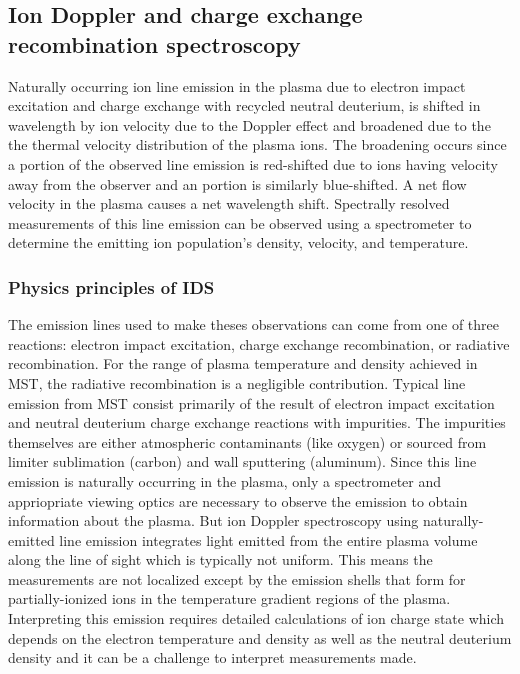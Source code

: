 \subsection{Ion Doppler and charge exchange recombination spectroscopy}\label{sec:ids}

Naturally occurring ion line emission in the plasma due to electron impact excitation and charge exchange with recycled neutral deuterium, is shifted in wavelength by ion velocity due to the Doppler effect and broadened due to the the thermal velocity distribution of the plasma ions. The broadening occurs since a portion of the observed line emission is red-shifted due to ions having velocity away from the observer and an portion is similarly blue-shifted. A net flow velocity in the plasma causes a net wavelength shift. Spectrally resolved measurements of this line emission can be observed using a spectrometer to determine the emitting ion population's density, velocity, and temperature.

\subsubsection{Physics principles of IDS}
The emission lines used to make theses observations can come from one of three reactions: electron impact excitation, charge exchange recombination, or radiative recombination. For the range of plasma temperature and density achieved in MST, %
the radiative recombination is a negligible contribution. Typical line emission from MST consist primarily of the result of electron impact excitation and neutral deuterium charge exchange reactions with impurities. The impurities themselves are either atmospheric contaminants (like oxygen) or sourced from limiter sublimation (carbon) and wall sputtering (aluminum). Since this line emission is naturally occurring in the plasma, only a spectrometer and appriopriate viewing optics are necessary to observe the emission to obtain information about the plasma. But ion Doppler spectroscopy using naturally-emitted line emission integrates light emitted from the entire plasma volume along the line of sight which is typically not uniform. This means the measurements are not localized except by the emission shells that form for partially-ionized ions in the temperature gradient regions of the plasma. Interpreting this emission requires detailed calculations of ion charge state which depends on the electron temperature and density as well as the neutral deuterium density and it can be a challenge to interpret measurements made. 

